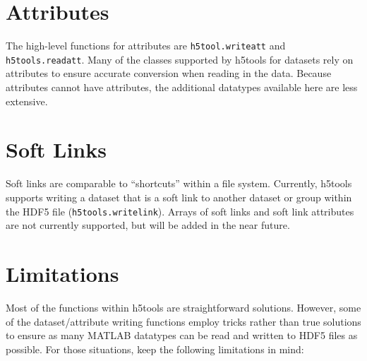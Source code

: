 \documentclass[11pt]{exam}
\newcommand\myfcn[1]{\colorbox{codegray}{\textcolor{codeblue}{\texttt{#1}}}}
\begin{document}
    \section{Attributes}
        \noindent The high-level functions for attributes are \myfcn{h5tool.writeatt} and \myfcn{h5tools.readatt}. Many of the classes supported by h5tools for datasets rely on attributes to ensure accurate conversion when reading in the data. Because attributes cannot have attributes, the additional datatypes available here are less extensive. 
        
    \section{Soft Links}
    	\noindent Soft links are comparable to ``shortcuts'' within a file system. Currently, h5tools supports writing a dataset that is a soft link to another dataset or group within the HDF5 file (\myfcn{h5tools.writelink}). Arrays of soft links and soft link attributes are not currently supported, but will be added in the near future. 

	\section{Limitations}
		\noindent 
		Most of the functions within h5tools are straightforward solutions. However, some of the dataset/attribute writing functions employ tricks rather than true solutions to ensure as many MATLAB datatypes can be read and written to HDF5 files as possible. For those situations, keep the following limitations in mind:
\end{document}
